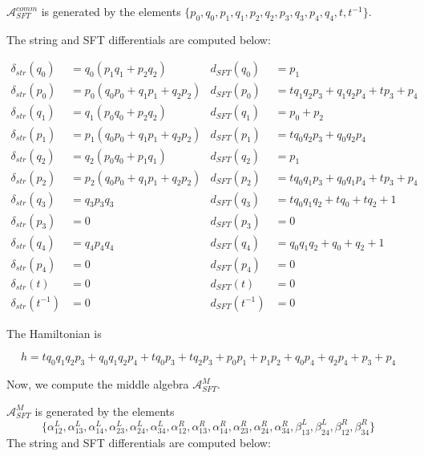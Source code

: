 \documentclass[a4paper,final, reqno]{amsart}
\theoremstyle{plain}
\theoremstyle{definition}
\newcommand{\A}{\mathcal{A}}
\begin{document}
		
		$\A_{SFT}^{comm}$ is generated by the elements $\{p_0,q_0,p_1,q_1,p_2,q_2,p_3,q_3,p_4,q_4,t,t^{-1}\}$.
		
		
		The string and SFT differentials are computed below:
		
		
		\begin{align*}
			\delta_{str}(q_0) &= q_0(p_1q_1+p_2q_2) & d_{SFT}(q_0) &= p_1 \\
			\delta_{str}(p_0) &= p_0(q_0p_0+q_1p_1+q_2p_2) & d_{SFT}(p_0) &= tq_1q_2p_3+q_1q_2p_4+tp_3+p_4 \\		
			\delta_{str}(q_1) &= q_1(p_0q_0+p_2q_2) & d_{SFT}(q_1) &= p_0+p_2 \\
			\delta_{str}(p_1) &= p_1(q_0p_0+q_1p_1+q_2p_2) & d_{SFT}(p_1) &= tq_0q_2p_3+q_0q_2p_4 \\
			\delta_{str}(q_2) &= q_2(p_0q_0+p_1q_1) & d_{SFT}(q_2) &= p_1 \\
			\delta_{str}(p_2) &= p_2(q_0p_0+q_1p_1+q_2p_2) & d_{SFT}(p_2) &= tq_0q_1p_3+q_0q_1p_4+tp_3+p_4 \\
			\delta_{str}(q_3) &= q_3p_3q_3 & d_{SFT}(q_3) &= tq_0q_1q_2+tq_0+tq_2+1 \\
			\delta_{str}(p_3) &= 0 & d_{SFT}(p_3) &= 0 \\
			\delta_{str}(q_4) &= q_4p_4q_4 & d_{SFT}(q_4) &= q_0q_1q_2+q_0+q_2+1 \\
			\delta_{str}(p_4) &= 0 & d_{SFT}(p_4) &= 0 \\
			\delta_{str}(t) &= 0 & d_{SFT}(t) &= 0 \\
			\delta_{str}(t^{-1}) &= 0 & d_{SFT}(t^{-1}) &= 0
		\end{align*}
		
		The Hamiltonian is 
		
		\[ h = tq_0q_1q_2p_3+q_0q_1q_2p_4+tq_0p_3+tq_2p_3+p_0p_1+p_1p_2+q_0p_4+q_2p_4+p_3+p_4\]
		
		
		Now, we compute the middle algebra $\A_{SFT}^M$. 
		
		$\A_{SFT}^M$ is generated by the elements 
		\[ \{\alpha_{12}^L, \alpha_{13}^L, \alpha_{14}^L, \alpha_{23}^L, \alpha_{24}^L, \alpha_{34}^L, \alpha_{12}^R, \alpha_{13}^R, \alpha_{14}^R, \alpha_{23}^R, \alpha_{24}^R, \alpha_{34}^R, \beta_{13}^L, \beta_{24}^L, \beta_{12}^R, \beta_{34}^R\}\] 
		The string and SFT differentials are computed below:
		
\end{document}
